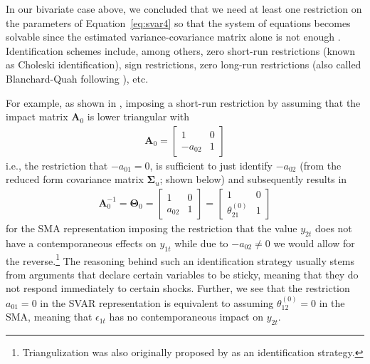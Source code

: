 \documentclass[a4paper,11pt,listof=nochaptergap,oneside,pointednumbers,bibtotoc,bigheadings,liststotoc,hidelinks]{scrbook}
\theoremstyle{mysatz}
\theoremstyle{mydefinition}
\theoremstyle{mytheorem}
\theoremstyle{mybemerkung}
\newcommand{\vect}[1]{\boldsymbol{\mathbf{#1}}}
\begin{document}
In our bivariate case above, we concluded that we need at least one restriction on the parameters of Equation~\ref{eq:svar4} so that the system of equations becomes solvable since the estimated variance-covariance matrix alone is not enough \citep{ludvigsonetal:20a}. Identification schemes include, among others, zero short-run restrictions (known as Choleski identification), sign restrictions, zero long-run restrictions (also called Blanchard-Quah following \citealp{blanchardandquah:89}), etc. \citep{foroni:15}

For example, as shown in \citet{zivot:00}, imposing a short-run restriction by assuming that the impact matrix $\vect{A}_0$ is lower triangular with
\begin{equation} \label{eq:svar11}
\begin{split}
 		\vect{A}_0 = 	\begin{bmatrix}
    					1 & 0 \\
					-a_{02} & 1
 					\end{bmatrix}
\end{split}								
\end{equation}
i.e., the restriction that $-a_{01}=0$, is sufficient to just identify $-a_{02}$ (from the reduced form covariance matrix $\vect{\Sigma}_u$; shown below) and subsequently results in 
\begin{equation} \label{eq:svar12}
\begin{split}
 		\vect{A}_0^{-1} = \vect{\Theta}_0 = 	
					\begin{bmatrix}
    					1 & 0 \\
					a_{02} & 1
 					\end{bmatrix} = 
						\begin{bmatrix}
    						1 & 0 \\
						\theta_{21}^{(0)} & 1
 						\end{bmatrix}
\end{split}								
\end{equation}
for the SMA representation imposing the restriction that the value $y_{2t}$ does not have a contemporaneous effects on $y_{1t}$ while due to $-a_{02} \neq 0$ we would allow for the reverse.\footnote{Triangulization was also originally proposed by \citet{sims:80} as an identification strategy.} The reasoning behind such an identification strategy usually stems from arguments that declare certain variables to be sticky, meaning that they do not respond immediately to certain shocks. Further, we see that the restriction $a_{01}=0$ in the SVAR representation is equivalent to assuming $\theta_{12}^{(0)}=0$ in the SMA, meaning that $\epsilon_{1t}$ has no contemporaneous impact on $y_{2t}$.
\end{document}
